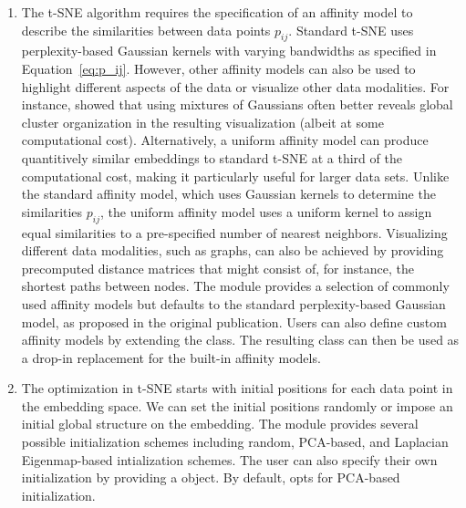 \documentclass[article]{jss}
\newcommand{\opentsne}{\pkg{openTSNE}\xspace}
\begin{document}
\begin{enumerate}
\item The t-SNE algorithm requires the specification of an affinity model to describe the similarities between data points $p_{ij}$. Standard t-SNE uses perplexity-based Gaussian kernels with varying bandwidths as specified in Equation~\ref{eq:p_ij}. However, other affinity models can also be used to highlight different aspects of the data or visualize other data modalities. For instance, \citet{kobak2019art} showed that using mixtures of Gaussians often better reveals global cluster organization in the resulting visualization (albeit at some computational cost). Alternatively, a uniform affinity model can produce quantitively similar embeddings to standard t-SNE at a third of the computational cost, making it particularly useful for larger data sets. Unlike the standard affinity model, which uses Gaussian kernels to determine the similarities $p_{ij}$, the uniform affinity model uses a uniform kernel to assign equal similarities to a pre-specified number of nearest neighbors. Visualizing different data modalities, such as graphs, can also be achieved by providing precomputed distance matrices that might consist of, for instance, the shortest paths between nodes. The  module provides a selection of commonly used affinity models but defaults to the standard perplexity-based Gaussian model, as proposed in the original publication. Users can also define custom affinity models by extending the  class. The resulting class can then be used as a drop-in replacement for the built-in affinity models.

\item The optimization in t-SNE starts with initial positions for each data point in the embedding space. We can set the initial positions randomly or impose an initial global structure on the embedding. %
The  module provides several possible initialization schemes including random, PCA-based, and Laplacian Eigenmap-based intialization schemes. The user can also specify their own initialization by providing a  object. By default, \opentsne opts for PCA-based initialization.


\end{enumerate}
\end{document}
